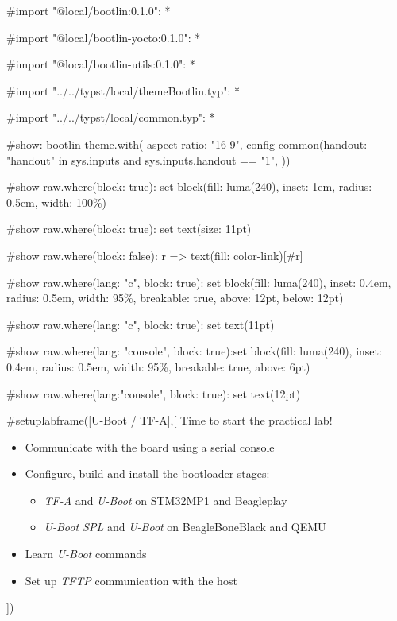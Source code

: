 #import "@local/bootlin:0.1.0": *

#import "@local/bootlin-yocto:0.1.0": *

#import "@local/bootlin-utils:0.1.0": *

#import "../../typst/local/themeBootlin.typ": *

#import "../../typst/local/common.typ": *

#show: bootlin-theme.with( aspect-ratio: "16-9", config-common(handout: "handout" in sys.inputs and sys.inputs.handout == "1", ))

#show raw.where(block: true): set block(fill: luma(240), inset: 1em, radius: 0.5em, width: 100\%)

#show raw.where(block: true): set text(size: 11pt)

#show raw.where(block: false): r => text(fill: color-link)[#r]

#show raw.where(lang: "c", block: true): set block(fill: luma(240), inset: 0.4em, radius: 0.5em, width: 95\%, breakable: true, above: 12pt, below: 12pt)

#show raw.where(lang: "c", block: true): set text(11pt)

#show raw.where(lang: "console", block: true):set block(fill: luma(240), inset: 0.4em, radius: 0.5em, width: 95\%, breakable: true, above: 6pt)

#show raw.where(lang:"console", block: true): set text(12pt)

 #setuplabframe([U-Boot / TF-A],[
  Time to start the practical lab!
  \begin{itemize}
  \item Communicate with the board using a serial console
  \item Configure, build and install the bootloader stages:
        \begin{itemize}
		\item {\em TF-A} and {\em U-Boot} on STM32MP1 and Beagleplay
		\item {\em U-Boot SPL} and {\em U-Boot} on BeagleBoneBlack and QEMU
	\end{itemize}
  \item Learn {\em U-Boot} commands
  \item Set up {\em TFTP} communication with the host
  \end{itemize}
])
